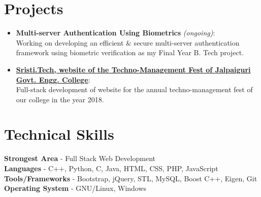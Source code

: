 \documentclass[margin, centered, a4paper]{res}
\begin{document}
\begin{resume}
\section{Projects}
\begin{itemize}[leftmargin=*]
\item
\textbf{Multi-server Authentication Using Biometrics} \textit{(ongoing)}:\\ Working on developing an efficient \& secure multi-server authentication framework using biometric verification as my Final Year B. Tech project.
\item
\textbf{\href{http://sristi.tech}{Sristi.Tech, website of the Techno-Management Fest of Jalpaiguri Govt. Engg. College}}:\\ Full-stack development of website for the annual techno-management fest of our college in the year 2018.

\end{itemize}

\section{Technical Skills}
\textbf{Strongest Area} - Full Stack Web Development\\
\textbf{Languages} - C++, Python, C, Java, HTML, CSS, PHP, JavaScript\\
\textbf{Tools/Frameworks} - Bootstrap, jQuery, STL, MySQL, Boost C++, Eigen, Git\\
\textbf{Operating System} - GNU/Linux, Windows




\end{resume}
\end{document}
